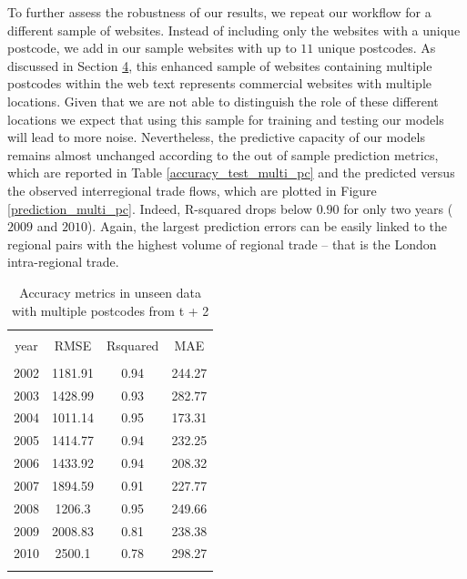 \documentclass[sigconf]{acmart}
\begin{document}
To further assess the robustness of our results, we repeat our workflow
for a different sample of websites. Instead of including only the
websites with a unique postcode, we add in our sample websites with up
to \(11\) unique postcodes. As discussed in Section
\protect\hyperlink{sec:4}{4}, this enhanced sample of websites
containing multiple postcodes within the web text represents commercial
websites with multiple locations. Given that we are not able to
distinguish the role of these different locations we expect that using
this sample for training and testing our models will lead to more noise.
Nevertheless, the predictive capacity of our models remains almost
unchanged according to the out of sample prediction metrics, which are
reported in Table \ref{accuracy_test_multi_pc} and the predicted versus
the observed interregional trade flows, which are plotted in Figure
\ref{prediction_multi_pc}. Indeed, R-squared drops below \(0.90\) for
only two years (\(2009\) and \(2010\)). Again, the largest prediction
errors can be easily linked to the regional pairs with the highest
volume of regional trade -- that is the London intra-regional trade.

\begin{table}[!htbp] \centering 
	\caption{Accuracy metrics in unseen data with multiple postcodes from t + 2\label{accuracy_test_multi_pc}} 
	\label{} 
	\footnotesize 
	\begin{tabular}{@{\extracolsep{0pt}} cccc} 
		\\[-1.8ex]\hline 
		\hline \\[-1.8ex] 
		year & RMSE & Rsquared & MAE \\ 
		\hline \\[-1.8ex] 
		2002 & 1181.91 & 0.94 & 244.27 \\ 
		2003 & 1428.99 & 0.93 & 282.77 \\ 
		2004 & 1011.14 & 0.95 & 173.31 \\ 
		2005 & 1414.77 & 0.94 & 232.25 \\ 
		2006 & 1433.92 & 0.94 & 208.32 \\ 
		2007 & 1894.59 & 0.91 & 227.77 \\ 
		2008 & 1206.3 & 0.95 & 249.66 \\ 
		2009 & 2008.83 & 0.81 & 238.38 \\ 
		2010 & 2500.1 & 0.78 & 298.27 \\ 
		\hline \\[-1.8ex] 
	\end{tabular} 
\end{table}
\end{document}
